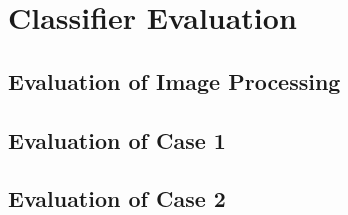 \section{Classifier Evaluation}
\label{sec:Eval}

\subsection{Evaluation of Image Processing}

\subsection{Evaluation of Case 1}

\subsection{Evaluation of Case 2}